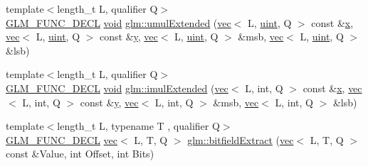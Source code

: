 \begin{DoxyCompactItemize}
\item 
{\footnotesize template$<$length\+\_\+t L, qualifier Q$>$ }\\\mbox{\hyperlink{setup_8hpp_ab2d052de21a70539923e9bcbf6e83a51}{G\+L\+M\+\_\+\+F\+U\+N\+C\+\_\+\+D\+E\+CL}} \mbox{\hyperlink{_s_d_l__opengles2__gl2ext_8h_ae5d8fa23ad07c48bb609509eae494c95}{void}} \mbox{\hyperlink{group__core__func__integer_ga732e2fb56db57ea541c7e5c92b7121be}{glm\+::umul\+Extended}} (\mbox{\hyperlink{structglm_1_1vec}{vec}}$<$ L, \mbox{\hyperlink{group__core__precision_ga4fd29415871152bfb5abd588334147c8}{uint}}, Q $>$ const \&\mbox{\hyperlink{_s_d_l__opengl_8h_ad0e63d0edcdbd3d79554076bf309fd47}{x}}, \mbox{\hyperlink{structglm_1_1vec}{vec}}$<$ L, \mbox{\hyperlink{group__core__precision_ga4fd29415871152bfb5abd588334147c8}{uint}}, Q $>$ const \&\mbox{\hyperlink{_s_d_l__opengl_8h_a1675d9d7bb68e1657ff028643b4037e3}{y}}, \mbox{\hyperlink{structglm_1_1vec}{vec}}$<$ L, \mbox{\hyperlink{group__core__precision_ga4fd29415871152bfb5abd588334147c8}{uint}}, Q $>$ \&msb, \mbox{\hyperlink{structglm_1_1vec}{vec}}$<$ L, \mbox{\hyperlink{group__core__precision_ga4fd29415871152bfb5abd588334147c8}{uint}}, Q $>$ \&lsb)
\item 
{\footnotesize template$<$length\+\_\+t L, qualifier Q$>$ }\\\mbox{\hyperlink{setup_8hpp_ab2d052de21a70539923e9bcbf6e83a51}{G\+L\+M\+\_\+\+F\+U\+N\+C\+\_\+\+D\+E\+CL}} \mbox{\hyperlink{_s_d_l__opengles2__gl2ext_8h_ae5d8fa23ad07c48bb609509eae494c95}{void}} \mbox{\hyperlink{group__core__func__integer_gac0c510a70e852f57594a9141848642e3}{glm\+::imul\+Extended}} (\mbox{\hyperlink{structglm_1_1vec}{vec}}$<$ L, int, Q $>$ const \&\mbox{\hyperlink{_s_d_l__opengl_8h_ad0e63d0edcdbd3d79554076bf309fd47}{x}}, \mbox{\hyperlink{structglm_1_1vec}{vec}}$<$ L, int, Q $>$ const \&\mbox{\hyperlink{_s_d_l__opengl_8h_a1675d9d7bb68e1657ff028643b4037e3}{y}}, \mbox{\hyperlink{structglm_1_1vec}{vec}}$<$ L, int, Q $>$ \&msb, \mbox{\hyperlink{structglm_1_1vec}{vec}}$<$ L, int, Q $>$ \&lsb)
\item 
{\footnotesize template$<$length\+\_\+t L, typename T , qualifier Q$>$ }\\\mbox{\hyperlink{setup_8hpp_ab2d052de21a70539923e9bcbf6e83a51}{G\+L\+M\+\_\+\+F\+U\+N\+C\+\_\+\+D\+E\+CL}} \mbox{\hyperlink{structglm_1_1vec}{vec}}$<$ L, T, Q $>$ \mbox{\hyperlink{group__core__func__integer_ga346b25ab11e793e91a4a69c8aa6819f2}{glm\+::bitfield\+Extract}} (\mbox{\hyperlink{structglm_1_1vec}{vec}}$<$ L, T, Q $>$ const \&Value, int Offset, int Bits)
\item 

\end{DoxyCompactItemize}
